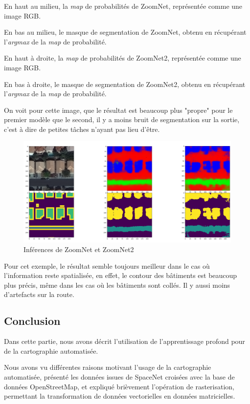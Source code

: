\documentclass[a4paper, 11pt]{report}
\begin{document}
En haut au milieu, la \emph{map} de probabilités de ZoomNet, représentée comme une image RGB.

En bas au milieu, le masque de segmentation de ZoomNet, obtenu en récupérant l'\emph{argmax} de la \emph{map} de probabilité.

En haut à droite, la \emph{map} de probabilités de ZoomNet2, représentée comme une image RGB.

En bas à droite, le masque de segmentation de ZoomNet2, obtenu en récupérant l'\emph{argmax} de la \emph{map} de probabilité.

On voit pour cette image, que le résultat est beaucoup plus "propre" pour le premier modèle que le second, il y a moins bruit de segmentation sur la sortie, c'est à dire de petites tâches n'ayant pas lieu d'être.

\begin{figure}[H]
	\begin{center}
		\includegraphics[scale=0.225]{Images/ZoomNets_5000.png}
		\caption{Inférences de ZoomNet et ZoomNet2}
	\end{center}
\end{figure}

Pour cet exemple, le résultat semble toujours meilleur dans le cas où l'information reste spatialisée, en effet, le contour des bâtiments est beaucoup plus précis, même dans les cas où les bâtiments sont collés. Il y aussi moins d'artefacts sur la route.
\subsection{Conclusion}
Dans cette partie, nous avons décrit l'utilisation de l'apprentissage profond pour de la cartographie automatisée.

Nous avons vu différentes raisons motivant l'usage de la cartographie automatisée, présenté les données issues de SpaceNet croisées avec la base de données OpenStreetMap, et expliqué brièvement l'opération de rasterisation, permettant la transformation de données vectorielles en données matricielles.
\end{document}

